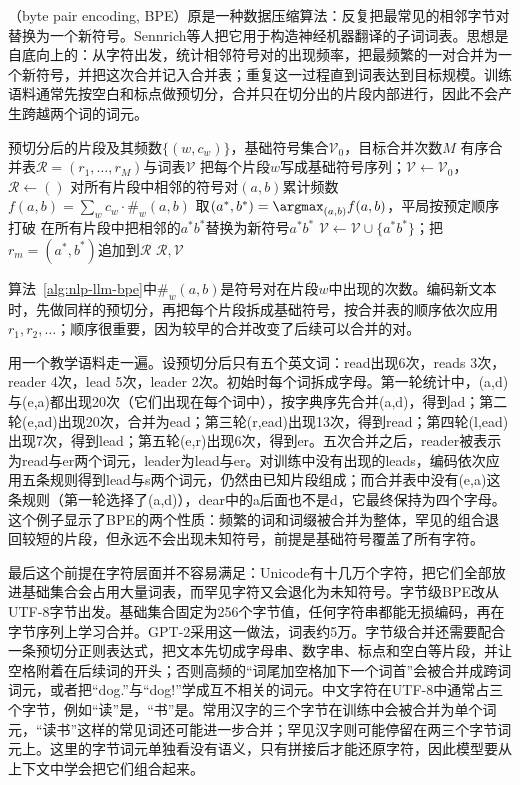 （byte pair encoding, BPE）原是一种数据压缩算法：反复把最常见的相邻字节对替换为一个新符号。Sennrich等人把它用于构造神经机器翻译的子词词表。思想是自底向上的：从字符出发，统计相邻符号对的出现频率，把最频繁的一对合并为一个新符号，并把这次合并记入合并表；重复这一过程直到词表达到目标规模。训练语料通常先按空白和标点做预切分，合并只在切分出的片段内部进行，因此不会产生跨越两个词的词元。

\begin{algorithm}[BPE词表学习]
  \label{alg:nlp-llm-bpe}
  \begin{algorithmic}[1]
    \Require 预切分后的片段及其频数$\{(w,c_w)\}$，基础符号集合$\mathcal V_0$，目标合并次数$M$
    \Ensure 有序合并表$\mathcal R=(r_1,\ldots,r_M)$与词表$\mathcal V$
    \State 把每个片段$w$写成基础符号序列；$\mathcal V\gets\mathcal V_0$，$\mathcal R\gets()$
      \State 对所有片段中相邻的符号对$(a,b)$累计频数$f(a,b)=\sum_w c_w\cdot\#_w(a,b)$
      \State 取$(a^\ast,b^\ast)=\argmax_{(a,b)}f(a,b)$，平局按预定顺序打破
      \State 在所有片段中把相邻的$a^\ast b^\ast$替换为新符号$a^\ast b^\ast$
      \State $\mathcal V\gets\mathcal V\cup\{a^\ast b^\ast\}$；把$r_m=(a^\ast,b^\ast)$追加到$\mathcal R$
    \EndFor
    \State \Return $\mathcal R,\mathcal V$
  \end{algorithmic}
\end{algorithm}

算法~\ref{alg:nlp-llm-bpe}中$\#_w(a,b)$是符号对在片段$w$中出现的次数。编码新文本时，先做同样的预切分，再把每个片段拆成基础符号，按合并表的顺序依次应用$r_1,r_2,\ldots$；顺序很重要，因为较早的合并改变了后续可以合并的对。

用一个教学语料走一遍。设预切分后只有五个英文词：read出现6次，reads 3次，reader 4次，lead 5次，leader 2次。初始时每个词拆成字母。第一轮统计中，(a,d)与(e,a)都出现20次（它们出现在每个词中），按字典序先合并(a,d)，得到ad；第二轮(e,ad)出现20次，合并为ead；第三轮(r,ead)出现13次，得到read；第四轮(l,ead)出现7次，得到lead；第五轮(e,r)出现6次，得到er。五次合并之后，reader被表示为read与er两个词元，leader为lead与er。对训练中没有出现的leads，编码依次应用五条规则得到lead与s两个词元，仍然由已知片段组成；而合并表中没有(e,a)这条规则（第一轮选择了(a,d)），dear中的a后面也不是d，它最终保持为四个字母。这个例子显示了BPE的两个性质：频繁的词和词缀被合并为整体，罕见的组合退回较短的片段，但永远不会出现未知符号，前提是基础符号覆盖了所有字符。

最后这个前提在字符层面并不容易满足：Unicode有十几万个字符，把它们全部放进基础集合会占用大量词表，而罕见字符又会退化为未知符号。字节级BPE改从UTF-8字节出发。基础集合固定为256个字节值，任何字符串都能无损编码，再在字节序列上学习合并。GPT-2采用这一做法，词表约5万。字节级合并还需要配合一条预切分正则表达式，把文本先切成字母串、数字串、标点和空白等片段，并让空格附着在后续词的开头；否则高频的“词尾加空格加下一个词首”会被合并成跨词词元，或者把“dog.”与“dog!”学成互不相关的词元。中文字符在UTF-8中通常占三个字节，例如“读”是，“书”是。常用汉字的三个字节在训练中会被合并为单个词元，“读书”这样的常见词还可能进一步合并；罕见汉字则可能停留在两三个字节词元上。这里的字节词元单独看没有语义，只有拼接后才能还原字符，因此模型要从上下文中学会把它们组合起来。

